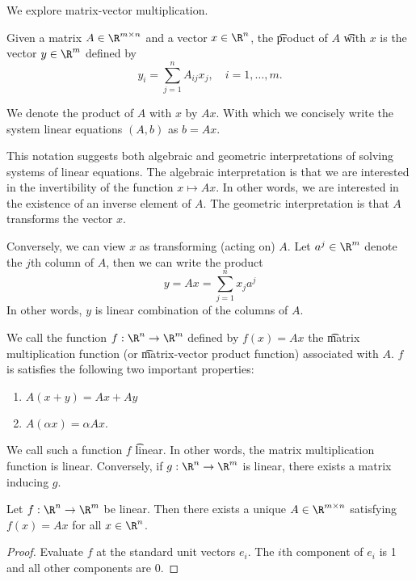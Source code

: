 
We explore matrix-vector multiplication.

Given a matrix $A \in \R^{m \times n}$ and a vector $x \in \R^{n}$, the \t{product} of $A$ \t{with} $x$ is the vector $y \in \R^{m}$ defined by
  \[
y_i = \sum_{j = 1}^{n} A_{ij} x_j, \quad i = 1, \dots, m.
  \]

We denote the product of $A$ with $x$ by $Ax$.
With which we concisely write the system linear equations $(A, b)$ as $b = Ax$.

This notation suggests both algebraic and geometric interpretations of solving systems of linear equations.
The algebraic interpretation is that we are interested in the invertibility of the function $x \mapsto Ax$.
In other words, we are interested in the existence of an inverse element of $A$.
The geometric interpretation is that $A$ transforms the vector $x$.

Conversely, we can view $x$ as transforming (acting on) $A$.
Let $a^j \in \R^m$ denote the $j$th column of $A$, then we can write the product
  \[
y = Ax = \sum_{j = 1}^{n} x_j a^j
  \]
In other words, $y$ is linear combination of the columns of $A$.

We call the function $f: \R^n \to \R^m$ defined by $f(x) = Ax$ the \t{matrix multiplication function} (or \t{matrix-vector product function}) associated with $A$.
$f$ is satisfies the following two important properties:
  \begin{enumerate}
  \item $A(x + y) = Ax + Ay$
  \item $A(\alpha x) = \alpha Ax$.
  \end{enumerate}
We call such a function $f$ \t{linear}.
In other words, the matrix multiplication function is linear.
Conversely, if $g: \R^n \to \R^m$ is linear, there exists a matrix inducing $g$.
\begin{proposition}
Let $f: \R^n \to \R^m$ be linear. Then there exists a unique $A \in \R^{m \times n}$ satisfying $f(x) = Ax$ for all $x \in \R^n$.
\end{proposition}
\begin{proof}
Evaluate $f$ at the standard unit vectors $e_i$.
The $i$th component of $e_i$ is 1 and all other components are 0.
\end{proof}
